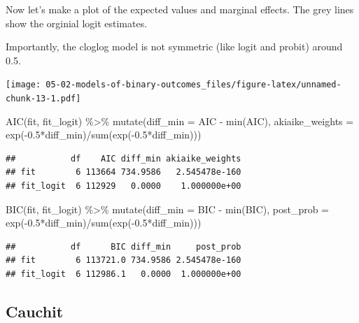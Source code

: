 \documentclass[
]{book}
\newenvironment{Shaded}{\begin{snugshade}}{\end{snugshade}}
\newcommand{\AttributeTok}[1]{\textcolor[rgb]{0.77,0.63,0.00}{#1}}
\newcommand{\FloatTok}[1]{\textcolor[rgb]{0.00,0.00,0.81}{#1}}
\newcommand{\FunctionTok}[1]{\textcolor[rgb]{0.00,0.00,0.00}{#1}}
\newcommand{\NormalTok}[1]{#1}
\newcommand{\SpecialCharTok}[1]{\textcolor[rgb]{0.00,0.00,0.00}{#1}}
\begin{document}
Now let's make a plot of the expected values and marginal effects. The grey lines show the orginial logit estimates.

Importantly, the cloglog model is not symmetric (like logit and probit) around 0.5.

\texttt{[image: 05-02-models-of-binary-outcomes\_files/figure-latex/unnamed-chunk-13-1.pdf]}

\begin{Shaded}
\begin{Highlighting}[]
\FunctionTok{AIC}\NormalTok{(fit, fit\_logit) }\SpecialCharTok{\%\textgreater{}\%}
  \FunctionTok{mutate}\NormalTok{(}\AttributeTok{diff\_min =}\NormalTok{ AIC }\SpecialCharTok{{-}} \FunctionTok{min}\NormalTok{(AIC),}
         \AttributeTok{akiaike\_weights =} \FunctionTok{exp}\NormalTok{(}\SpecialCharTok{{-}}\FloatTok{0.5}\SpecialCharTok{*}\NormalTok{diff\_min)}\SpecialCharTok{/}\FunctionTok{sum}\NormalTok{(}\FunctionTok{exp}\NormalTok{(}\SpecialCharTok{{-}}\FloatTok{0.5}\SpecialCharTok{*}\NormalTok{diff\_min)))}
\end{Highlighting}
\end{Shaded}

\begin{verbatim}
##           df    AIC diff_min akiaike_weights
## fit        6 113664 734.9586   2.545478e-160
## fit_logit  6 112929   0.0000    1.000000e+00
\end{verbatim}

\begin{Shaded}
\begin{Highlighting}[]
\FunctionTok{BIC}\NormalTok{(fit, fit\_logit) }\SpecialCharTok{\%\textgreater{}\%}
  \FunctionTok{mutate}\NormalTok{(}\AttributeTok{diff\_min =}\NormalTok{ BIC }\SpecialCharTok{{-}} \FunctionTok{min}\NormalTok{(BIC),}
         \AttributeTok{post\_prob =} \FunctionTok{exp}\NormalTok{(}\SpecialCharTok{{-}}\FloatTok{0.5}\SpecialCharTok{*}\NormalTok{diff\_min)}\SpecialCharTok{/}\FunctionTok{sum}\NormalTok{(}\FunctionTok{exp}\NormalTok{(}\SpecialCharTok{{-}}\FloatTok{0.5}\SpecialCharTok{*}\NormalTok{diff\_min)))}
\end{Highlighting}
\end{Shaded}

\begin{verbatim}
##           df      BIC diff_min     post_prob
## fit        6 113721.0 734.9586 2.545478e-160
## fit_logit  6 112986.1   0.0000  1.000000e+00
\end{verbatim}

\hypertarget{cauchit}{%
\subsection{Cauchit}\label{cauchit}}
\end{document}
